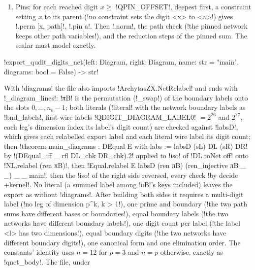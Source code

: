 {{{\begin{algorithm}
\begin{enumerate}
phase tables come from \lexpy!_qudit_table! and \lexpy!_turns_table! over $p^{k}$ values, entries on
the $1/p$ grid (\lexcode!node <id> has a phase <t> off the 1/<p> grid!).
\item Pins: for each reached digit $x\ge$ \lexpy!QPIN_OFFSET!, deepest first, a constraint setting
$x$ to its parent (\lexcode!no constraint sets the digit <x> to <a>!) gives \lexlean!.perm [x, path]!,
\lexlean!.pin a!. Then \lexlean!.norm!, the path check (\lexcode!the pinned network keeps other path variables!), and the reduction steps of the pinned sum. The scalar must model exactly.
\end{enumerate}
\end{algorithm}

\begin{signature}
\lexpy!export_qudit_digits_net(left: Diagram, right: Diagram, name: str = "main", diagrams: bool = False) -> str!
\end{signature}
With \py!diagrams! the file also imports \lexlean!ArchytasZX.NetRelabel! and ends with
\py!_diagram_lines!: \lexlean!πB! is the permutation (\py!_swap!) of the boundary labels onto the
slots $0,\dots,n_b-1$; both literals (\py!literal! with the network boundary labels as
\py!bnd_labels!, first wire labels \py!QDIGIT_DIAGRAM_LABEL0! $=2^{26}$ and $2^{27}$, each leg's
dimension index its label's digit count) are checked against \lexlean!labsD!, which gives each
relabelled export label and each literal wire label its digit count; then
\lexlean!theorem main_diagrams : DEqual { E with labs := labsD } (sL) DL (sR) DR! by
\lexlean!(DEqual_iff _ rfl DL_chk DR_chk).2! applied to \lexlean!iso! of \lexlean!DL.toNet off!
onto \lexlean!NL.relabel (ren πB)!, then
\lexlean!Equal.relabel E labsD (ren πB) (ren_injective πB _ _) _ _ main!, then the \lexlean!iso! of
the right side reversed, every check \lexlean!by decide +kernel!. No literal (a summed label
among \lexlean!πB!'s keys included) leaves the export as without \py!diagrams!.
After building both sides it requires a multi-digit label (\lexcode!no leg of dimension p^k, k > 1!), one prime and boundary (\lexcode!the two path sums have different bases or boundaries!), equal
boundary labels (\lexcode!the two networks have different boundary labels!), one digit count per
label (\lexcode!the label <l> has two dimensions!), equal boundary digits (\lexcode!the two networks have different boundary digits!), one canonical form and one elimination order. The constants'
identity uses $n=12$ for $p=3$ and $n=p$ otherwise, exactly as \lexpy!qnet_body!. The file, under
}}}
